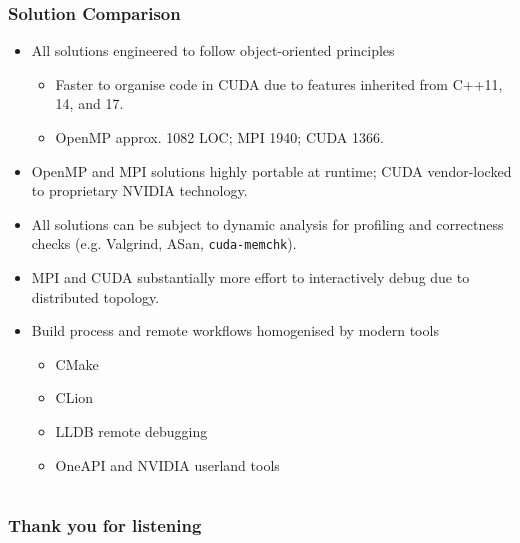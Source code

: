 \documentclass[aspectratio=169]{beamer}
\numberwithin{figure}{section}
\begin{document}
\begin{frame}
    \frametitle{Solution Comparison}
    \begin{itemize}
        \item All solutions engineered to follow object-oriented principles
            \begin{itemize}
                \item Faster to organise code in CUDA due to features inherited
                    from C++11, 14, and 17.
                \item OpenMP approx. 1082 LOC; MPI 1940; CUDA 1366.
            \end{itemize}
        \item OpenMP and MPI solutions highly portable at runtime; CUDA
            vendor-locked to proprietary NVIDIA technology.
        \item All solutions can be subject to dynamic analysis for profiling and
            correctness checks (e.g. Valgrind, ASan, \texttt{cuda-memchk}).
        \item MPI and CUDA substantially more effort to interactively debug due
            to distributed topology.
        \item Build process and remote workflows homogenised by modern tools
            \begin{itemize}
                \item CMake
                \item CLion
                \item LLDB remote debugging
                \item OneAPI and NVIDIA userland tools
            \end{itemize}
    \end{itemize}
\end{frame}
\section{}
\begin{frame}
    \frametitle{Thank you for listening}
\end{frame}
\end{document}
